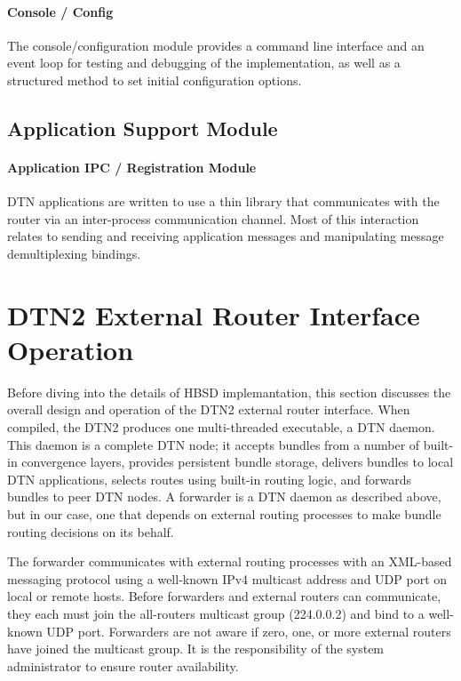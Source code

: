 \paragraph{Console / Config}
The console/configuration module provides a command line interface and an event loop for testing and debugging of the implementation, as well as a structured method
to set initial configuration options. 

\subsection{Application Support Module}

\paragraph{Application IPC / Registration Module}

DTN applications are written to use a thin library that communicates with the router via an inter-process communication channel. Most of this interaction relates to
sending and receiving application messages and manipulating message demultiplexing bindings.

\section{DTN2 External Router Interface Operation}

Before diving into the details of HBSD implemantation, this section discusses the overall design and operation of the DTN2 external router interface. When compiled, the DTN2 produces one multi-threaded executable, a DTN daemon. This daemon is a complete DTN node; it accepts bundles from a number of built-in convergence layers, provides persistent bundle storage, delivers bundles to local DTN applications, selects routes using built-in routing logic, and forwards bundles to peer DTN nodes. A forwarder is a DTN daemon as described above, but in our case, one that depends on external routing processes to make bundle routing decisions on its behalf.

The forwarder communicates with external routing processes with an XML-based messaging protocol using a well-known IPv4 multicast address and UDP port on local or remote hosts. Before forwarders and external routers can communicate, they each must join the all-routers multicast group (224.0.0.2) and bind to a well-known UDP port. Forwarders are not aware if zero, one, or more external routers have joined the multicast group. It is the responsibility of the system administrator to ensure router availability.

